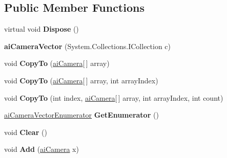 \subsection*{Public Member Functions}
\begin{DoxyCompactItemize}
\item 
\hypertarget{classai_camera_vector_ade9ebe1e24959413cc22b5b437ca63dd}{virtual void {\bfseries Dispose} ()}\label{classai_camera_vector_ade9ebe1e24959413cc22b5b437ca63dd}

\item 
\hypertarget{classai_camera_vector_a33ee108575c9f9792f3e0223da57d13d}{{\bfseries ai\+Camera\+Vector} (System.\+Collections.\+I\+Collection c)}\label{classai_camera_vector_a33ee108575c9f9792f3e0223da57d13d}

\item 
\hypertarget{classai_camera_vector_af6c15fd97cbfa05803bd74627b129135}{void {\bfseries Copy\+To} (\hyperlink{structai_camera}{ai\+Camera}\mbox{[}$\,$\mbox{]} array)}\label{classai_camera_vector_af6c15fd97cbfa05803bd74627b129135}

\item 
\hypertarget{classai_camera_vector_a5bb8a8b8e7e5eb21c4da3aaa043afbb6}{void {\bfseries Copy\+To} (\hyperlink{structai_camera}{ai\+Camera}\mbox{[}$\,$\mbox{]} array, int array\+Index)}\label{classai_camera_vector_a5bb8a8b8e7e5eb21c4da3aaa043afbb6}

\item 
\hypertarget{classai_camera_vector_a7f9d59d1ba1906890bb68a1cb02dfd34}{void {\bfseries Copy\+To} (int index, \hyperlink{structai_camera}{ai\+Camera}\mbox{[}$\,$\mbox{]} array, int array\+Index, int count)}\label{classai_camera_vector_a7f9d59d1ba1906890bb68a1cb02dfd34}

\item 
\hypertarget{classai_camera_vector_a15ee9c1d61dc36f669d8d383a9782316}{\hyperlink{classai_camera_vector_1_1ai_camera_vector_enumerator}{ai\+Camera\+Vector\+Enumerator} {\bfseries Get\+Enumerator} ()}\label{classai_camera_vector_a15ee9c1d61dc36f669d8d383a9782316}

\item 
\hypertarget{classai_camera_vector_ad1b7bc301a2e47938c5b5bb6f563a1b4}{void {\bfseries Clear} ()}\label{classai_camera_vector_ad1b7bc301a2e47938c5b5bb6f563a1b4}

\item 
\hypertarget{classai_camera_vector_a37089a067a3a78ba8e4a096058143359}{void {\bfseries Add} (\hyperlink{structai_camera}{ai\+Camera} x)}\label{classai_camera_vector_a37089a067a3a78ba8e4a096058143359}


\end{DoxyCompactItemize}
